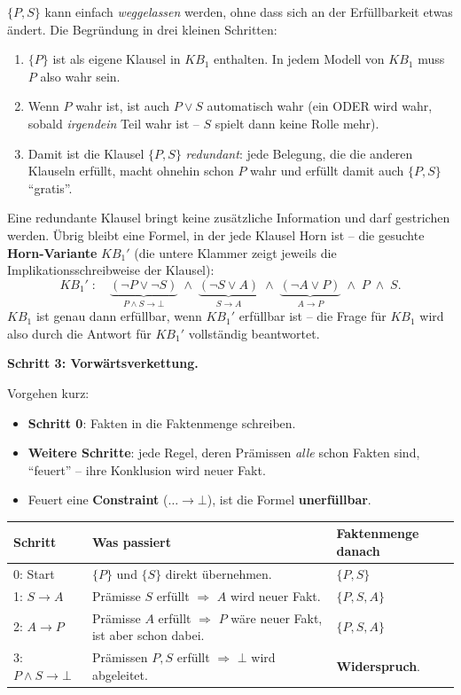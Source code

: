 \documentclass[a4paper,12pt]{article}
\begin{document}
$\{P, S\}$ kann einfach \emph{weggelassen} werden, ohne dass sich an der
Erf\"ullbarkeit etwas \"andert. Die Begr\"undung in drei kleinen Schritten:
\begin{enumerate}[nosep,leftmargin=2em]
\item $\{P\}$ ist als eigene Klausel in $KB_1$ enthalten. In jedem Modell
      von $KB_1$ muss $P$ also wahr sein.
\item Wenn $P$ wahr ist, ist auch $P \vee S$ automatisch wahr (ein ODER
      wird wahr, sobald \emph{irgendein} Teil wahr ist -- $S$ spielt
      dann keine Rolle mehr).
\item Damit ist die Klausel $\{P, S\}$ \emph{redundant}: jede Belegung,
      die die anderen Klauseln erf\"ullt, macht ohnehin schon $P$ wahr
      und erf\"ullt damit auch $\{P, S\}$ ``gratis''.
\end{enumerate}
Eine redundante Klausel bringt keine zus\"atzliche Information und darf
gestrichen werden. \"Ubrig bleibt eine Formel, in der jede Klausel Horn
ist -- die gesuchte \textbf{Horn-Variante} $KB_1'$ (die untere Klammer
zeigt jeweils die Implikationsschreibweise der Klausel):
\[
KB_1' \;:\quad \underbrace{(\neg P \vee \neg S)}_{P \wedge S \to \bot}
\;\wedge\; \underbrace{(\neg S \vee A)}_{S \to A}
\;\wedge\; \underbrace{(\neg A \vee P)}_{A \to P}
\;\wedge\; P \;\wedge\; S.
\]
$KB_1$ ist genau dann erf\"ullbar, wenn $KB_1'$ erf\"ullbar ist -- die
Frage f\"ur $KB_1$ wird also durch die Antwort f\"ur $KB_1'$ vollst\"andig
beantwortet.

\bigskip
\textbf{Schritt 3: Vorw\"artsverkettung.}

Vorgehen kurz:
\begin{itemize}[nosep,leftmargin=2em]
\item \textbf{Schritt 0}: Fakten in die Faktenmenge schreiben.
\item \textbf{Weitere Schritte}: jede Regel, deren Pr\"amissen \emph{alle}
      schon Fakten sind, ``feuert'' -- ihre Konklusion wird neuer Fakt.
\item Feuert eine \textbf{Constraint} ($\dots \to \bot$), ist die Formel
      \textbf{unerf\"ullbar}.
\end{itemize}

\begin{center}
\small
\renewcommand{\arraystretch}{1.3}
\begin{tabular}{p{}p{}p{}}
\toprule
Schritt & Was passiert & Faktenmenge danach \\
\midrule
0: Start
& $\{P\}$ und $\{S\}$ direkt \"ubernehmen.
& $\{P, S\}$ \\
\midrule
1: $S \to A$
& Pr\"amisse $S$ erf\"ullt $\Rightarrow$ $A$ wird neuer Fakt.
& $\{P, S, A\}$ \\
\midrule
2: $A \to P$
& Pr\"amisse $A$ erf\"ullt $\Rightarrow$ $P$ w\"are neuer Fakt, ist aber schon dabei.
& $\{P, S, A\}$ \\
\midrule
3: $P \wedge S \to \bot$
& Pr\"amissen $P, S$ erf\"ullt $\Rightarrow$ $\bot$ wird abgeleitet.
& \textbf{Widerspruch}. \\
\bottomrule
\end{tabular}
\end{center}
\end{document}
